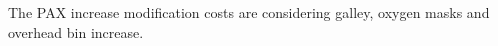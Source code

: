 The PAX increase modification costs are considering galley, oxygen masks and overhead bin increase.


\begin{figure}[H] %
\label{fig:InteriorCostSum1}
\end{figure}

\begin{figure}[H] %
\label{fig:InteriorCostSum2}
\end{figure}